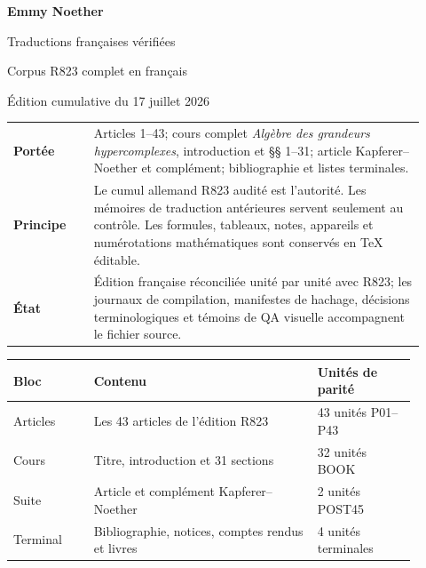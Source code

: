 \documentclass[11pt]{article}
\begin{document}
\thispagestyle{empty}
\begin{center}
{\huge\bfseries Emmy Noether}\par
\vspace{0.55em}
{\Large Traductions françaises vérifiées}\par
\vspace{0.35em}
{\large Corpus R823 complet en français}\par
\vspace{1.25em}
{\normalsize Édition cumulative du 17 juillet 2026}
\end{center}

\vspace{2.5em}

\noindent\begin{tabular}{@{}p{0.18\linewidth}p{0.74\linewidth}@{}}
\textbf{Portée} &
Articles 1--43; cours complet \emph{Algèbre des grandeurs hypercomplexes}, introduction et \S\S{} 1--31; article Kapferer--Noether et complément; bibliographie et listes terminales.\\[0.7em]
\textbf{Principe} &
Le cumul allemand R823 audité est l'autorité. Les mémoires de traduction antérieures servent seulement au contrôle. Les formules, tableaux, notes, appareils et numérotations mathématiques sont conservés en \TeX{} éditable.\\[0.7em]
\textbf{État} &
Édition française réconciliée unité par unité avec R823; les journaux de compilation, manifestes de hachage, décisions terminologiques et témoins de QA visuelle accompagnent le fichier source.\\
\end{tabular}

\vspace{2.5em}

\begin{center}
\small
\begin{tabular}{@{}p{0.18\linewidth}p{0.50\linewidth}p{0.22\linewidth}@{}}
\toprule
Bloc & Contenu & Unités de parité \\
\midrule
Articles & Les 43 articles de l'édition R823 & 43 unités P01--P43 \\
Cours & Titre, introduction et 31 sections & 32 unités BOOK \\
Suite & Article et complément Kapferer--Noether & 2 unités POST45 \\
Terminal & Bibliographie, notices, comptes rendus et livres & 4 unités terminales \\
\bottomrule
\end{tabular}
\end{center}
\end{document}
